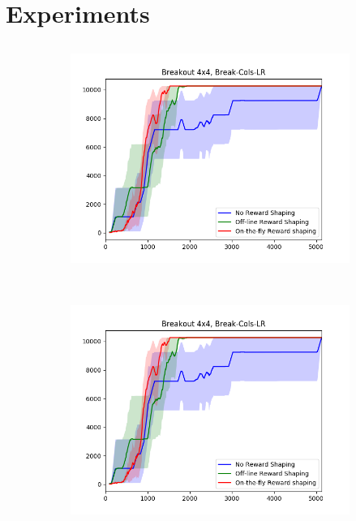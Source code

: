 \chapter{Experiments}

\section{\Breakout}



\begin{figure}[h]
	 \centering
	 \begin{subfigure}[b]{0.3\textwidth}
	 	\includegraphics[width=\textwidth]{images/b44-cols-comparison.png}
	 \end{subfigure}
	 ~ %
	 \begin{subfigure}[b]{0.3\textwidth}
	 	\includegraphics[width=\textwidth]{images/b44-cols-comparison.png}

\end{subfigure}
\end{figure}
